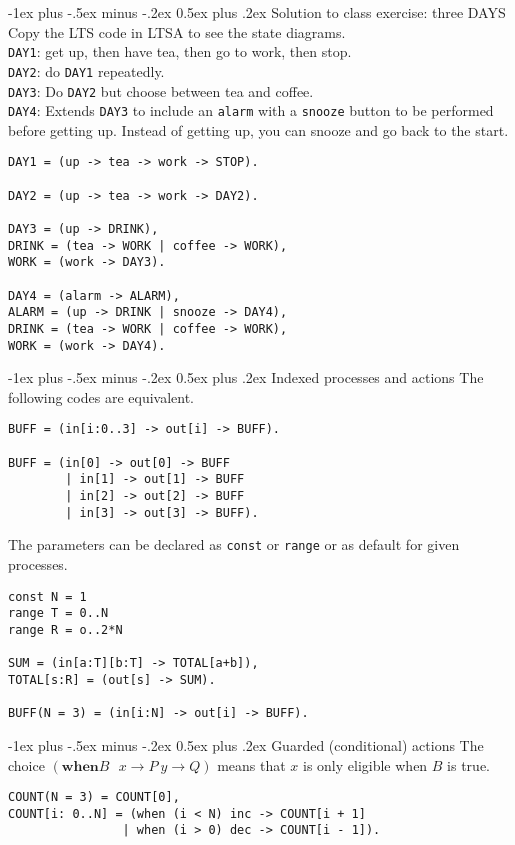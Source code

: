 \documentclass[10pt,landscape]{article}
\makeatletter
\renewcommand{\section}{\@startsection{section}{1}{0mm}%
                                {-1ex plus -.5ex minus -.2ex}%
                                {0.5ex plus .2ex}%
                                {\normalfont\large\bfseries}}
\makeatother
\begin{document}
\begin{multicols}{3}
\section{Solution to class exercise: three DAYS}
Copy the LTS code in LTSA to see the state diagrams. \\
\texttt{DAY1}: get up, then have tea, then go to work, then stop. \\
\texttt{DAY2}: do \texttt{DAY1} repeatedly. \\
\texttt{DAY3}: Do \texttt{DAY2} but choose between tea and coffee. \\
\texttt{DAY4}: Extends \texttt{DAY3} to include an \texttt{alarm} with a \texttt{snooze} button to be performed before getting up. Instead of getting up, you can snooze and go back to the start.
\begin{verbatim}
DAY1 = (up -> tea -> work -> STOP).

DAY2 = (up -> tea -> work -> DAY2).

DAY3 = (up -> DRINK),
DRINK = (tea -> WORK | coffee -> WORK),
WORK = (work -> DAY3).

DAY4 = (alarm -> ALARM),
ALARM = (up -> DRINK | snooze -> DAY4),
DRINK = (tea -> WORK | coffee -> WORK),
WORK = (work -> DAY4).
\end{verbatim}
\section{Indexed processes and actions}
The following codes are equivalent.
\begin{verbatim}
BUFF = (in[i:0..3] -> out[i] -> BUFF).

BUFF = (in[0] -> out[0] -> BUFF
        | in[1] -> out[1] -> BUFF
        | in[2] -> out[2] -> BUFF
        | in[3] -> out[3] -> BUFF).
\end{verbatim}
The parameters can be declared as \texttt{const} or \texttt{range} or as default for given processes.
\begin{verbatim}
const N = 1
range T = 0..N
range R = o..2*N

SUM = (in[a:T][b:T] -> TOTAL[a+b]),
TOTAL[s:R] = (out[s] -> SUM).

BUFF(N = 3) = (in[i:N] -> out[i] -> BUFF).
\end{verbatim}
\section{Guarded (conditional) actions}
The choice $(\textbf{when} B\text{ } x \rightarrow P \ y \rightarrow Q)$ means that $x$ is only eligible when $B$ is true.
\begin{verbatim}
COUNT(N = 3) = COUNT[0],
COUNT[i: 0..N] = (when (i < N) inc -> COUNT[i + 1]
                | when (i > 0) dec -> COUNT[i - 1]).
                

\end{verbatim}
\end{multicols}
\end{document}
